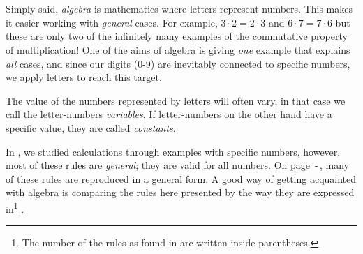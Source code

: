 



\section{\algintro}
Simply said, \textit{algebra} is mathematics where letters represent numbers. This makes it easier working with \textsl{general} cases. For example, $ 3\cdot 2=2\cdot3 $ and $ {6\cdot7=7\cdot6} $ but these are only two of the infinitely many examples of the commutative property of multiplication! One of the aims of algebra is giving \textsl{one} example that explains \textsl{all} cases, and since our digits (0-9) are inevitably connected to specific numbers, we apply letters to reach this target. \vsk

The value of the numbers represented by letters will often vary, in that case we call the letter-numbers \textit{variables}. If letter-numbers on the other hand have a specific value, they are called \textit{constants}.

\vsk

In , we studied calculations through examples with specific numbers, however, most of these rules are \textsl{general}; they are valid for all numbers. On page \pageref{regstart}\,-\,\pageref{regslutt}, many of these rules are reproduced in a general form. A good way of getting acquainted with algebra is comparing the rules here presented by the way they are expressed in\footnote{The number of the rules as found in  are written inside parentheses.} . \vsk

\regv
\label{regstart}
\reg[\adkom\;(\ref{adkom}) \label{adkomalg}]{\vs
\[ a+ b =b+a \]
}
\eks{ \vsb
\[ 7+ 5=5+7 \]
} \vsk \vsk

\reg[\gangkom\;(\ref{gangkom})]{\vs
	\[ a\cdot b =b\cdot a \]
}
\eks[1]{ \vsb
	\[ 9\cdot 8=8\cdot9 \]
}
\eks[2]{ \vsb
\[  8\cdot a= a\cdot 8  \]
}
\newpage
{}
\vsk 

\reg[\brdef\;(\ref{brdef})]{
\[ a:b=\frac{a}{b} \]
}
\eks[]{ \vs
\[a:2= \frac{a}{2} \]
}
 \vsk 

